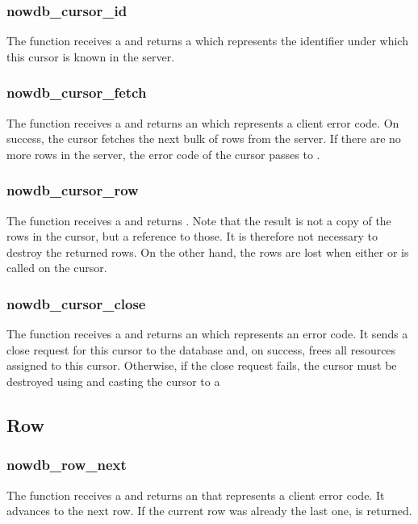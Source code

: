 \subsubsection{nowdb\_cursor\_id}
The function receives a 
and returns a  which
represents the identifier under which this
cursor is known in the server.

\subsubsection{nowdb\_cursor\_fetch}
The function receives a 
and returns an  which
represents a client error code.
On success, the cursor fetches the next
bulk of rows from the server.
If there are no more rows in the server,
the error code of the cursor passes to .

\subsubsection{nowdb\_cursor\_row}
The function receives a 
and returns .
Note that the result is not a copy
of the rows in the cursor, but a reference
to those.
It is therefore not necessary to destroy
the returned rows.
On the other hand, the rows are lost
when either  or 
is called on the cursor. 

\subsubsection{nowdb\_cursor\_close}
The function receives a 
and returns an  which represents an
error code.
It sends a close request for this cursor
to the database and, on success,
frees all resources assigned to this cursor.
Otherwise, if the close request fails,
the cursor must be destroyed using 
 and
casting the cursor to a 

\subsection{Row}
\subsubsection{nowdb\_row\_next}
The function receives a 
and returns an  that represents
a client error code.
It advances to the next row.
If the current row was already the last one,
 is returned.

